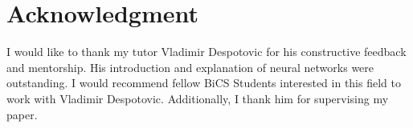 \section*{Acknowledgment}
I would like to thank my tutor Vladimir Despotovic for his constructive feedback and
mentorship. His introduction and explanation of neural networks were outstanding. I
would recommend fellow BiCS Students interested in this field to work with
Vladimir Despotovic. Additionally, I thank him for supervising my paper.

